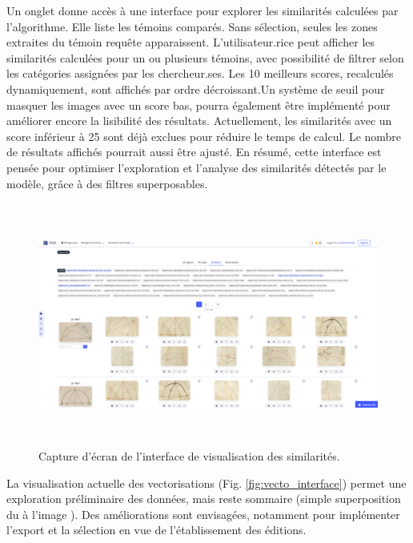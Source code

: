Un onglet donne accès à une interface pour explorer les similarités
calculées par l'algorithme. Elle liste les témoins comparés. Sans
sélection, seules les zones extraites du témoin requête apparaissent.
L'utilisateur.rice peut afficher les similarités calculées pour un ou
plusieurs témoins, avec possibilité de filtrer selon les catégories
assignées par les chercheur.ses. Les 10 meilleurs scores, recalculés
dynamiquement, sont affichés par ordre décroissant.Un système de seuil
pour masquer les images avec un score bas, pourra également être
implémenté pour améliorer encore la lisibilité des résultats.
Actuellement, les similarités avec un score inférieur à 25 sont déjà
exclues pour réduire le temps de calcul. Le nombre de résultats affichés
pourrait aussi être ajusté. En résumé, cette interface est pensée pour
optimiser l'exploration et l'analyse des similarités détectés par le
modèle, grâce à des filtres superposables.

\begin{figure}[H]
          \begin{center}
          \includegraphics[height=8cm]{figues/sim.png}
          \end{center}
          \caption{Capture d'écran de l'interface de visualisation des similarités.}
          \label{fig:sim_interface} \end{figure}

La visualisation actuelle des vectorisations (Fig. \ref{fig:vecto_interface}) permet une exploration
préliminaire des données, mais reste sommaire (simple superposition du
\svg à l'image \jpeg). Des améliorations sont envisagées, notamment pour
implémenter l'export et la sélection en vue de l'établissement des
éditions.

